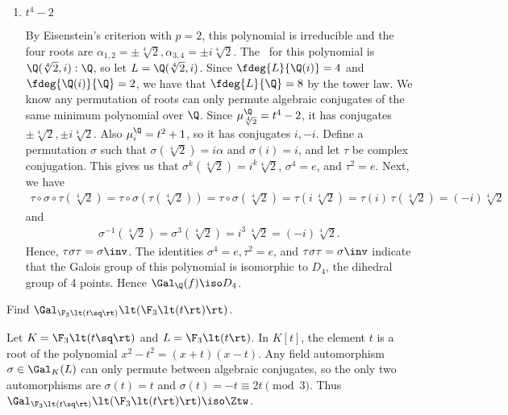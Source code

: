 \documentclass{article}
\begin{document}
\begin{enumerate}
\item \( t^4-2 \)
  \begin{solution}
    By Eisenstein's criterion with \( p=2 \), this polynomial is irreducible and the four roots are \( \alpha_{1,2} = \pm\sqrt[4]2, \alpha_{3,4}=\pm i\sqrt[4]2 \).
    The \sfe~for this polynomial is \( \Q(\sqrt[4]2,i):\Q \), so let \( L = \Q(\sqrt[4]2, i) \).
    Since \( \fdeg{L}{\Q(i)} = 4 \) and \( \fdeg{\Q(i)}{\Q}=2 \), we have that \( \fdeg{L}{\Q} = 8 \) by the tower law.
    We know any permutation of roots can only permute algebraic conjugates of the same minimum polynomial over \( \Q \).
    Since \( \mu_{\sqrt[4]{2}}^\Q=t^4-2 \), it has conjugates \( \pm\sqrt[4]2,\pm i\sqrt[4]2 \).
    Also \( \mu_i^\Q=t^2+1 \), so it has conjugates \( i,-i \).
    Define a permutation \( \sigma \) such that \( \sigma(\sqrt[4]{2})=i\alpha \) and \( \sigma(i)=i \), and let \( \tau \) be complex conjugation.
    This gives us that \( \sigma^k(\sqrt[4]2) = i^k\sqrt[4]{2} \), \( \sigma^4=e \), and \( \tau^2 = e \).
    Next, we have \begin{align*}
      \tau\circ\sigma\circ\tau(\sqrt[4]{2})=\tau\circ\sigma(\tau(\sqrt[4]{2}))=\tau\circ\sigma(\sqrt[4]{2})=\tau(i\,\sqrt[4]{2})=\tau(i)\,\tau(\sqrt[4]{2})=(-i)\sqrt[4]{2}
    \end{align*}
    and
    \begin{align*}
      \sigma^{-1}(\sqrt[4]{2})=\sigma^3(\sqrt[4]{2})= i^3\,\sqrt[4]{2} = (-i)\sqrt[4]{2}.
    \end{align*}
    Hence, \( \tau\sigma\tau = \sigma\inv \).
    The identities \( \sigma^4 = e,\tau^2 = e \), and \( \tau\sigma\tau = \sigma\inv \) indicate that the Galois group of this polynomial is isomorphic to \( D_4 \), the dihedral group of 4 points.
    Hence \( \Gal_\Q(f) \iso D_4 \).
  \end{solution}
\end{enumerate}

\begin{subexercise}
  Find \( \Gal_{\F_3\lt(t\sq\rt)}\lt(\F_3\lt(t\rt)\rt) \).
\end{subexercise}
\begin{solution}
  Let \( K = \F_3\lt(t\sq\rt) \) and \( L = \F_3\lt(t\rt) \).
  In \( K[t] \), the element \( t \) is a root of the polynomial \( x^2-t^2 = (x+t)(x-t) \).
  Any field automorphism \( \sigma\in \Gal_K(L) \) can only permute between algebraic conjugates, so the only two automorphisms are \( \sigma(t) = t \) and \( \sigma(t) = -t \equiv 2t \pmod 3 \).
  Thus \( \Gal_{\F_3\lt(t\sq\rt)}\lt(\F_3\lt(t\rt)\rt) \iso \Ztw \).
\end{solution}
\end{document}
